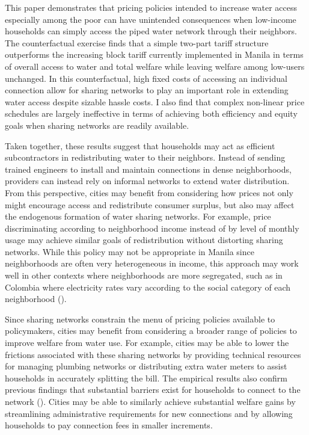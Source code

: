 \documentclass[12pt]{article}
\begin{document}

This paper demonstrates that pricing policies intended to increase water access especially among the poor can have unintended consequences when low-income households can simply access the piped water network through their neighbors.  The counterfactual exercise finds that a simple two-part tariff structure outperforms the increasing block tariff currently implemented in Manila in terms of overall access to water and total welfare while leaving welfare among low-users unchanged.  In this counterfactual, high fixed costs of accessing an individual connection allow for sharing networks to play an important role in extending water access despite sizable hassle costs.  I also find that complex non-linear price schedules are largely ineffective in terms of achieving both efficiency and equity goals when sharing networks are readily available.  

Taken together, these results suggest that households may act as efficient subcontractors in redistributing water to their neighbors.  Instead of sending trained engineers to install and maintain connections in dense neighborhoods, providers can instead rely on informal networks to extend water distribution.  From this perspective, cities may benefit from considering how prices not only might encourage access and redistribute consumer surplus, but also may affect the endogenous formation of water sharing networks.  For example, price discriminating according to neighborhood income instead of by level of monthly usage may achieve similar goals of redistribution without distorting sharing networks.  While this policy may not be appropriate in Manila since neighborhoods are often very heterogeneous in income, this approach may work well in other contexts where neighborhoods are more segregated, such as in Colombia where electricity rates vary according to the social category of each neighborhood (\cite{mcrae2014infrastructure}).  

Since sharing networks constrain the menu of pricing policies available to policymakers, cities may benefit from considering a broader range of policies to improve welfare from water use.  For example, cities may be able to lower the frictions associated with these sharing networks by providing technical resources for managing plumbing networks or distributing extra water meters to assist households in accurately splitting the bill.  The empirical results also confirm previous findings that substantial barriers exist for households to connect to the network (\cite{devoto2012happiness}).  Cities may be able to similarly achieve substantial welfare gains by streamlining administrative requirements for new connections and by allowing households to pay connection fees in smaller increments.  
\end{document}

